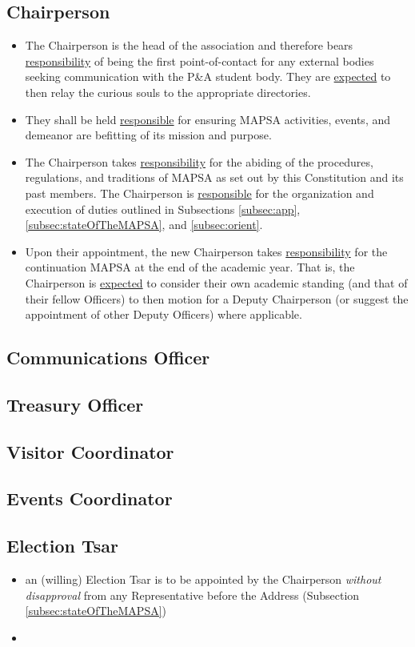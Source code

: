 \documentclass[8pt]{article}
\begin{document}
	\subsection{Chairperson}
	\begin{itemize}
		\item The Chairperson is the head of the association and therefore bears \underline{responsibility} of being the first point-of-contact for any external bodies seeking communication with the P\&A student body. They are \underline{expected} to then relay the curious souls to the appropriate directories. 
		\item They shall be held \underline{responsible} for ensuring MAPSA activities, events, and demeanor are befitting of its mission and purpose. 
		\item The Chairperson takes \underline{responsibility} for the abiding of the procedures, regulations, and traditions of MAPSA as set out by this Constitution and its past members.
		The Chairperson is \underline{responsible} for the organization and execution of duties outlined in Subsections \ref{subsec:app}, \ref{subsec:stateOfTheMAPSA}, and \ref{subsec:orient}.
		\item Upon their appointment, the new Chairperson takes \underline{responsibility} for the continuation MAPSA at the end of the academic year. That is, the Chairperson is \underline{expected} to consider their own academic standing (and that of their fellow Officers) to then motion for a Deputy Chairperson (or suggest the appointment of other Deputy Officers) where applicable.
	\end{itemize}
	\subsection{Communications Officer}
	\subsection{Treasury Officer}
	\subsection{Visitor Coordinator}
	\subsection{Events Coordinator}
	\subsection{Election Tsar}
	\begin{itemize}
	\item an (willing) Election Tsar is to be appointed by the Chairperson \textit{without disapproval} from any Representative before the Address (Subsection \ref{subsec:stateOfTheMAPSA})
	\item 
	\end{itemize}
\end{document}
